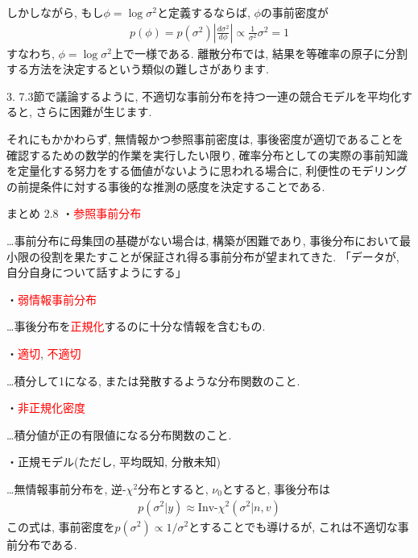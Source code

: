 \documentclass[10pt,dvipdfmx,a4]{beamer}
\newcommand{\eqn}[1]{\begin{align*}#1\end{align*}}
\newcommand{\tcr}[1]{\textcolor{red}{#1}}
\begin{document}
\begin{frame}
しかしながら, もし$\phi=\log \sigma^2$と定義するならば, $\phi$の事前密度が
\eqn{p(\phi)=p(\sigma^2)\left| \frac{d\sigma^2}{d\phi}\right| \propto \frac{1}{\sigma^2}\sigma^2=1}
すなわち, $\phi=\log \sigma^2$上で一様である.
離散分布では, 結果を等確率の原子に分割する方法を決定するという類似の難しさがあります.

3. 7.3節で議論するように, 不適切な事前分布を持つ一連の競合モデルを平均化すると, さらに困難が生じます.

それにもかかわらず, 無情報かつ参照事前密度は, 事後密度が適切であることを確認するための数学的作業を実行したい限り, 確率分布としての実際の事前知識を定量化する努力をする価値がないように思われる場合に, 利便性のモデリングの前提条件に対する事後的な推測の感度を決定することである.
\end{frame}


\begin{frame}{まとめ 2.8}
・\tcr{参照事前分布}

…事前分布に母集団の基礎がない場合は, 構築が困難であり, 事後分布において最小限の役割を果たすことが保証され得る事前分布が望まれてきた.
「データが, 自分自身について話すようにする」

・\tcr{弱情報事前分布}

…事後分布を\tcr{正規化}するのに十分な情報を含むもの.

・\tcr{適切}, \tcr{不適切}

…積分して1になる, または発散するような分布関数のこと.

・\tcr{非正規化密度}

…積分値が正の有限値になる分布関数のこと.

・正規モデル(ただし, 平均既知, 分散未知)

…無情報事前分布を, 逆-$\chi^2$分布とすると, $\nu_0$とすると, 事後分布は
\eqn{p(\sigma^2|y)\approx \text{Inv-}\chi^2(\sigma^2|n,v)}
この式は, 事前密度を$p(\sigma^2)\propto 1/\sigma^2$とすることでも導けるが, これは不適切な事前分布である.
\end{frame}

\end{document}
